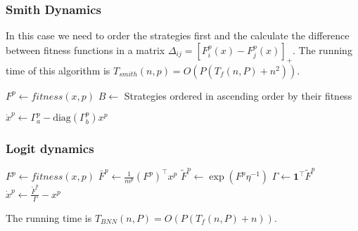 \subsubsection{Smith Dynamics}

In this case we need to order the strategies first and the calculate the difference between fitness functions in a matrix $\Delta_{ij} = [F_i^p(x) - F_j^p(x)]_+$. The running time of this algorithm is $T_{smith}(n,p) = O(P(T_f(n, P)+n^2 ))$.


\begin{algorithm}[H]

 \BlankLine
  {
  $ F^p \leftarrow fitness(x, p)$\;
  $B \leftarrow$ Strategies ordered in ascending order by their fitness  \;
  
  $ \dot{x}^p \leftarrow \Gamma_a^p - \text{diag}(\Gamma_b^p) x^p $\;
 }
\end{algorithm}




\subsubsection{Logit dynamics}

\begin{algorithm}[H]

 \BlankLine
 
  {
  $ F^p \leftarrow fitness(x, p)$\;
  $ \bar{F}^p \leftarrow \frac{1}{m^p} (F^p)^\top x^p$\;
  $ \tilde{F}^p \leftarrow \exp( F^p \eta^{-1} )$\;
  $ \Gamma \leftarrow \boldsymbol{1}^\top \tilde{F}^p $\;
  $ \dot{x}^p \leftarrow \frac{\tilde{F}^p}{\Gamma} - x^p $\;
 }
\end{algorithm}

The running time is $T_{BNN}(n,P) = O( P (  T_{f}(n,P) + n) ) $.
